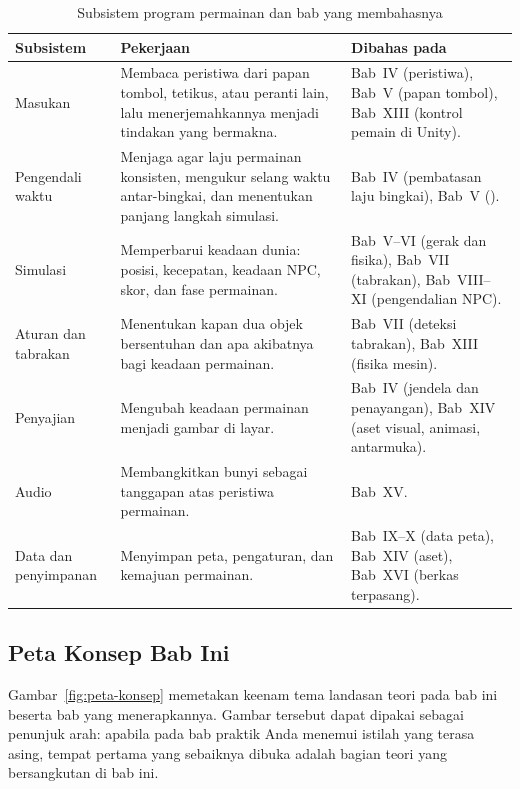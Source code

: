 \begin{table}[htbp]
\centering
\caption{Subsistem program permainan dan bab yang membahasnya}
\label{tab:subsistem}
{\setlength{\tabcolsep}{4pt}\footnotesize%
\begin{tabularx}{\textwidth}{@{}L{3.0cm} L{4.4cm} Y@{}}
\toprule
\headrow \textbf{Subsistem} & \textbf{Pekerjaan} & \textbf{Dibahas pada} \\
\midrule
Masukan &
Membaca peristiwa dari papan tombol, tetikus, atau peranti lain, lalu
menerjemahkannya menjadi tindakan yang bermakna. &
Bab~IV (peristiwa), Bab~V (papan tombol), Bab~XIII (kontrol pemain di Unity). \\
\addlinespace
Pengendali waktu &
Menjaga agar laju permainan konsisten, mengukur selang waktu antar-bingkai, dan
menentukan panjang langkah simulasi. &
Bab~IV (pembatasan laju bingkai), Bab~V (). \\
\addlinespace
Simulasi &
Memperbarui keadaan dunia: posisi, kecepatan, keadaan NPC, skor, dan fase
permainan. &
Bab~V--VI (gerak dan fisika), Bab~VII (tabrakan), Bab~VIII--XI (pengendalian
NPC). \\
\addlinespace
Aturan dan tabrakan &
Menentukan kapan dua objek bersentuhan dan apa akibatnya bagi keadaan
permainan. &
Bab~VII (deteksi tabrakan), Bab~XIII (fisika mesin). \\
\addlinespace
Penyajian &
Mengubah keadaan permainan menjadi gambar di layar. &
Bab~IV (jendela dan penayangan), Bab~XIV (aset visual, animasi, antarmuka). \\
\addlinespace
Audio &
Membangkitkan bunyi sebagai tanggapan atas peristiwa permainan. &
Bab~XV. \\
\addlinespace
Data dan penyimpanan &
Menyimpan peta, pengaturan, dan kemajuan permainan. &
Bab~IX--X (data peta), Bab~XIV (aset), Bab~XVI (berkas terpasang). \\
\bottomrule
\end{tabularx}}
\end{table}

\subsection{Peta Konsep Bab Ini}

Gambar~\ref{fig:peta-konsep} memetakan keenam tema landasan teori pada bab ini
beserta bab yang menerapkannya. Gambar tersebut dapat dipakai sebagai
penunjuk arah: apabila pada bab praktik Anda menemui istilah yang terasa asing,
tempat pertama yang sebaiknya dibuka adalah bagian teori yang bersangkutan di
bab ini.

